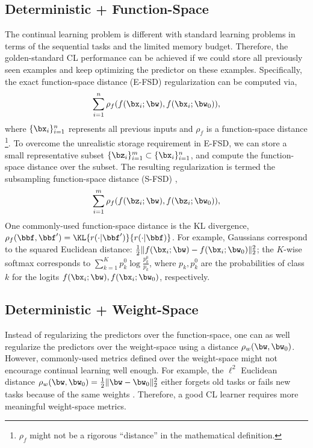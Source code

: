 \subsection{Deterministic + Function-Space} 
The continual learning problem is different with standard learning problems in terms of the sequential tasks and the limited memory budget. Therefore, the golden-standard CL performance can be achieved if we could store all previously seen examples and keep optimizing the predictor on these examples. Specifically, the exact function-space distance (E-FSD) regularization can be computed via,
\begin{align}
   \sum_{i=1}^{n} \rho_f(f(\bx_i; \bw), f(\bx_i; \bw_0)),
\end{align}
where $\{\bx_i\}_{i=1}^n$ represents all previous inputs and $\rho_f$ is a function-space distance \footnote{$\rho_f$ might not be a rigorous “distance” in the mathematical definition.}. To overcome the unrealistic storage requirement in E-FSD, we can store a small representative subset $\{\bz_i\}_{i=1}^m \subset \{\bx_i\}_{i=1}^n$, and compute the function-space distance over the subset. The resulting regularization is termed the subsampling function-space distance (S-FSD) \citep{benjamin2018measuring, buzzega2020dark, rebuffi2017icarl},
\begin{align}
   \sum_{i=1}^{m} \rho_f(f(\bz_i; \bw), f(\bz_i; \bw_0)),
\end{align}
One commonly-used function-space distance is the KL divergence, $\rho_f(\bbf, \bbf') = \KL{r(\cdot|\bbf')}{r(\cdot|\bbf)}$. For example, Gaussians correspond to the squared Euclidean distance: $\frac{1}{2}\|f(\bx_i; \bw)- f(\bx_i; \bw_0)\|_2^2$; the $K$-wise softmax corresponds to $\sum_{k=1}^K p_k^0 \log \frac{p_k^0}{p_k}$, where $p_k, p_k^0$ are the probabilities of class $k$ for the logits $f(\bx_i; \bw), f(\bx_i; \bw_0)$, respectively.


\subsection{Deterministic + Weight-Space}\label{subsec:dete-weight}
Instead of regularizing the predictors over the function-space, one can as well regularize the predictors over the weight-space using a distance $\rho_w(\bw, \bw_0)$. However, commonly-used metrics defined over the weight-space might not encourage continual learning well enough. For example, the $\ell^2$ Euclidean distance $\rho_w(\bw, \bw_0) = \frac{1}{2} \|\bw - \bw_0\|_2^2$ either forgets old tasks or fails new tasks because of the same weights \citep{kirkpatrick2017overcoming}. Therefore, a good CL learner requires more meaningful weight-space metrics.

